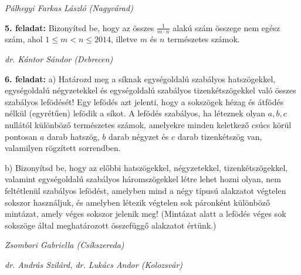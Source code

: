 \documentclass[a4paper,10pt]{article}
\newcommand{\ki}[2]{\hfill {\it #1 (#2)}\medskip}
\begin{document}
\ki{Pálhegyi Farkas László}{Nagyvárad}\medskip

{\bf 5. feladat: } Bizonyítsd be, hogy az összes $\frac{1}{m\cdot n}$
alakú szám összege nem egész szám, ahol $1\leq
m<n\leq2014$, illetve $m$ és $n$ természetes számok.


\ki{dr. Kántor Sándor}{Debrecen}\medskip

{\bf 6. feladat: } a) Határozd meg a síknak egységoldalú szabályos
hatszögekkel, egy\-ség\-oldalú négyzetekkel és
egységoldalú szabályos tizenkétszögekkel való összes
szabályos lefödését! Egy lefödés azt jelenti, hogy a
sokszögek hézag és átfödés nélkül (egyrétűen)
lefödik a síkot. A lefödés szabályos, ha léteznek olyan
$a,b,c$ nullától különböző természetes számok,
amelyekre minden keletkező csúcs körül pontosan $a$ darab
hatszög, $b$ darab négyzet és $c$ darab tizenkétszög van,
valamilyen rögzített sorrendben.

b) Bizonyítsd be, hogy az előbbi hatszögekkel,
négyzetekkel, tizenkétszögekkel, valamint egységoldalú
szabályos háromszögek\-kel létre lehet hozni olyan, nem
feltétlenül sza\-bá\-lyos lefödést, amelyben mind a négy
típusú alakzatot végtelen sokszor hasz\-náljuk, és
amelyben létezik végtelen sok páronként különböző
mintázat, amely véges sokszor jelenik meg! (Mintázat alatt a
lefödés véges sok sokszöge által meghatározott
összefüggő alakzatot értünk.)

\ki{Zsombori Gabriella}{Csíkszereda}

\ki{dr. András Szilárd, dr. Lukács Andor}{Kolozsvár}\medskip
\end{document}
